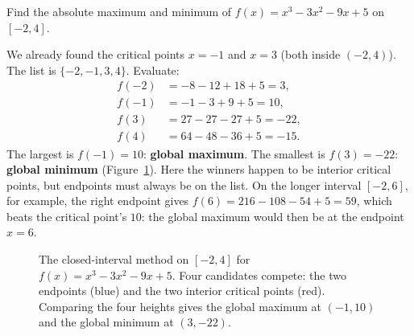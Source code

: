 \begin{example}\label{ch16:ex-closed}
Find the absolute maximum and minimum of $f(x)=x^3-3x^2-9x+5$ on $[-2,4]$.

\smallskip
We already found the critical points $x=-1$ and $x=3$ (both inside $(-2,4)$). The
list is $\{-2,-1,3,4\}$. Evaluate:
\[
\begin{aligned}
f(-2)&=-8-12+18+5=3,\\
f(-1)&=-1-3+9+5=10,\\
f(3)&=27-27-27+5=-22,\\
f(4)&=64-48-36+5=-15.
\end{aligned}
\]
The largest is $f(-1)=10$: \textbf{global maximum}. The smallest is $f(3)=-22$:
\textbf{global minimum} (Figure~\ref{ch16:fig-closed-interval}). Here the winners
happen to be interior critical points, but endpoints must always be on the list.
On the longer interval $[-2,6]$, for example, the right endpoint gives
$f(6)=216-108-54+5=59$, which beats the critical point's $10$: the global maximum
would then be at the endpoint $x=6$.
\end{example}

\begin{figure}[H]
\centering
{}
\caption{The closed-interval method on $[-2,4]$ for $f(x)=x^3-3x^2-9x+5$. Four
candidates compete: the two endpoints (blue) and the two interior critical points
(red). Comparing the four heights gives the global maximum at $(-1,10)$ and the
global minimum at $(3,-22)$.}
\label{ch16:fig-closed-interval}
\end{figure}


